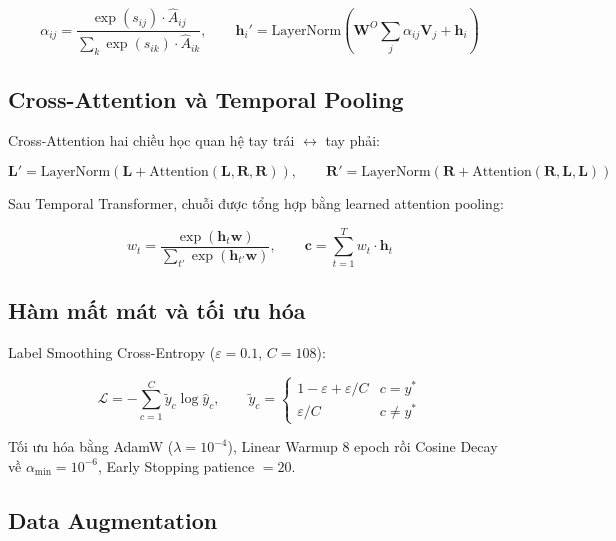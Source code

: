 \begin{equation}
    \alpha_{ij} = \frac{\exp(s_{ij}) \cdot \hat{A}_{ij}}{\sum_{k} \exp(s_{ik}) \cdot \hat{A}_{ik}}, \qquad
    \mathbf{h}_i' = \text{LayerNorm}\!\left(\mathbf{W}^O\sum_j \alpha_{ij}\mathbf{V}_j + \mathbf{h}_i\right)
\end{equation}

\subsection{Cross-Attention và Temporal Pooling}

Cross-Attention hai chiều học quan hệ tay trái $\leftrightarrow$ tay phải:

\begin{equation}
    \mathbf{L}' = \text{LayerNorm}(\mathbf{L} + \text{Attention}(\mathbf{L},\mathbf{R},\mathbf{R})), \qquad
    \mathbf{R}' = \text{LayerNorm}(\mathbf{R} + \text{Attention}(\mathbf{R},\mathbf{L},\mathbf{L}))
\end{equation}

Sau Temporal Transformer, chuỗi được tổng hợp bằng learned attention pooling:

\begin{equation}
    w_t = \frac{\exp(\mathbf{h}_t \mathbf{w})}{\sum_{t'} \exp(\mathbf{h}_{t'} \mathbf{w})}, \qquad
    \mathbf{c} = \sum_{t=1}^{T} w_t \cdot \mathbf{h}_t
\end{equation}

\subsection{Hàm mất mát và tối ưu hóa}

Label Smoothing Cross-Entropy ($\varepsilon = 0.1$, $C = 108$):

\begin{equation}
    \mathcal{L} = -\sum_{c=1}^{C} \tilde{y}_c \log \hat{y}_c, \qquad
    \tilde{y}_c = \begin{cases}
        1 - \varepsilon + \varepsilon/C & c = y^* \\
        \varepsilon/C                   & c \neq y^*
    \end{cases}
\end{equation}

Tối ưu hóa bằng AdamW ($\lambda = 10^{-4}$), Linear Warmup 8 epoch rồi Cosine Decay về $\alpha_\text{min} = 10^{-6}$, Early Stopping patience $= 20$.

\subsection{Data Augmentation}

